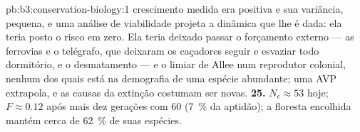 \begin{solution}{pb:b3:conservation-biology:1}
crescimento medida era positiva e sua variância, pequena, e uma análise
de viabilidade projeta a dinâmica que lhe é dada: ela teria posto o risco
em zero. Ela teria deixado passar o forçamento externo --- as ferrovias e
o telégrafo, que deixaram os caçadores seguir e esvaziar todo dormitório,
e o desmatamento --- e o limiar de Allee num reprodutor colonial, nenhum
dos quais está na demografia de uma espécie abundante; uma AVP extrapola,
e as causas da extinção costumam ser novas.
\textbf{25.} $N_{e} \approx 53$ hoje; $F \approx 0.12$ após mais dez
gerações com 60 (\qty{7}{\%} da aptidão); a floresta encolhida mantém
cerca de \qty{62}{\%} de suas espécies.
\end{solution}
